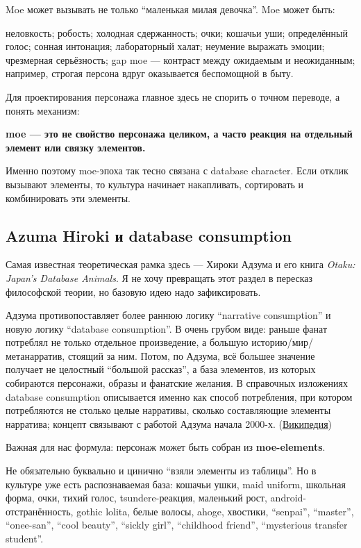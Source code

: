 Moe может вызывать не только ``маленькая милая девочка''. Moe может
быть:

неловкость; робость; холодная сдержанность; очки; кошачьи уши;
определённый голос; сонная интонация; лабораторный халат; неумение
выражать эмоции; чрезмерная серьёзность; gap moe --- контраст между
ожидаемым и неожиданным; например, строгая персона вдруг оказывается
беспомощной в быту.

Для проектирования персонажа главное здесь не спорить о точном переводе,
а понять механизм:

\textbf{moe --- это не свойство персонажа целиком, а часто реакция на
отдельный элемент или связку элементов.}

Именно поэтому moe-эпоха так тесно связана с database character. Если
отклик вызывают элементы, то культура начинает накапливать, сортировать
и комбинировать эти элементы.

\subsection*{Azuma Hiroki и database consumption}

Самая известная теоретическая рамка здесь --- Хироки Адзума и его книга
\emph{Otaku: Japan's Database Animals}. Я не хочу превращать этот раздел
в пересказ философской теории, но базовую идею надо зафиксировать.

Адзума противопоставляет более раннюю логику ``narrative consumption'' и
новую логику ``database consumption''. В очень грубом виде: раньше фанат
потреблял не только отдельное произведение, а большую
историю/\hspace{0pt}мир/\hspace{0pt}метанарратив, стоящий за ним. Потом, по Адзума, всё большее
значение получает не целостный ``большой рассказ'', а база элементов, из
которых собираются персонажи, образы и фанатские желания. В справочных
изложениях database consumption описывается именно как способ
потребления, при котором потребляются не столько целые нарративы,
сколько составляющие элементы нарратива; концепт связывают с работой
Адзума начала 2000-х.
(\href{https://en.wikipedia.org/wiki/Database_consumption?utm_source=chatgpt.com}{Википедия})

Важная для нас формула: персонаж может быть собран из
\textbf{moe-elements}.

Не обязательно буквально и цинично ``взяли элементы из таблицы''. Но в
культуре уже есть распознаваемая база: кошачьи ушки, maid uniform,
школьная форма, очки, тихий голос, tsundere-реакция, маленький рост,
android-отстранённость, gothic lolita, белые волосы, ahoge, хвостики,
``senpai'', ``master'', ``onee-san'', ``cool beauty'', ``sickly girl'',
``childhood friend'', ``mysterious transfer student''.

